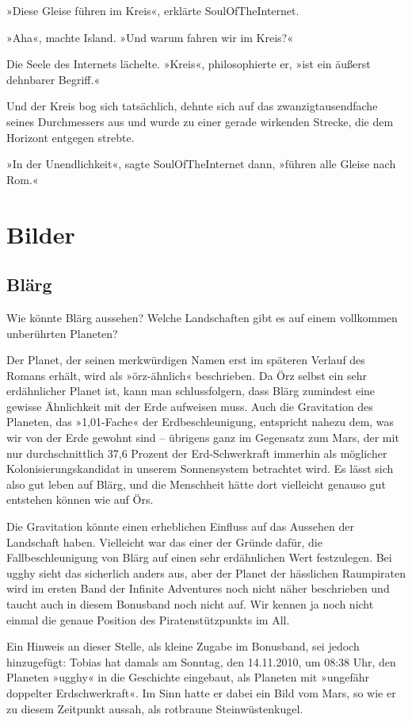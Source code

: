 »Diese Gleise führen im Kreis«, erklärte SoulOfTheInternet.

»Aha«, machte Island. »Und warum fahren wir im Kreis?«

Die Seele des Internets lächelte. »Kreis«, philosophierte er, »ist ein äußerst dehnbarer Begriff.«

Und der Kreis bog sich tatsächlich, dehnte sich auf das zwanzigtausendfache seines Durchmessers aus und wurde zu einer gerade wirkenden Strecke, die dem Horizont entgegen strebte.

»In der Unendlichkeit«, sagte SoulOfTheInternet dann, »führen alle Gleise nach Rom.« 


\part{Bilder}

\chapter{Blärg}

Wie könnte Blärg aussehen? Welche Landschaften gibt es auf einem vollkommen unberührten Planeten?

Der Planet, der seinen merkwürdigen Namen erst im späteren Verlauf des Romans erhält, wird als »örz-ähnlich« beschrieben. Da Örz selbst ein sehr erdähnlicher Planet ist, kann man schlussfolgern, dass Blärg zumindest eine gewisse Ähnlichkeit mit der Erde aufweisen muss. Auch die Gravitation des Planeten, das »1,01-Fache« der Erdbeschleunigung, entspricht nahezu dem, was wir von der Erde gewohnt sind – übrigens ganz im Gegensatz zum Mars, der mit nur durchschnittlich 37,6 Prozent der Erd-Schwerkraft immerhin als möglicher Kolonisierungskandidat in unserem Sonnensystem betrachtet wird. Es lässt sich also gut leben auf Blärg, und die Menschheit hätte dort vielleicht genauso gut entstehen können wie auf Örs.

Die Gravitation könnte einen erheblichen Einfluss auf das Aussehen der Landschaft haben. Vielleicht war das einer der Gründe dafür, die Fallbeschleunigung von Blärg auf einen sehr erdähnlichen Wert festzulegen. Bei ugghy sieht das sicherlich anders aus, aber der Planet der hässlichen Raumpiraten wird im ersten Band der Infinite Adventures noch nicht näher beschrieben und taucht auch in diesem Bonusband noch nicht auf. Wir kennen ja noch nicht einmal die genaue Position des Piratenstützpunkts im All. 

Ein Hinweis an dieser Stelle, als kleine Zugabe im Bonusband, sei jedoch hinzugefügt: Tobias hat damals am Sonntag, den 14.11.2010, um 08:38 Uhr, den Planeten »ugghy« in die Geschichte eingebaut, als Planeten mit »ungefähr doppelter Erdschwerkraft«. Im Sinn hatte er dabei ein Bild vom Mars, so wie er zu diesem Zeitpunkt aussah, als rotbraune Steinwüstenkugel.


